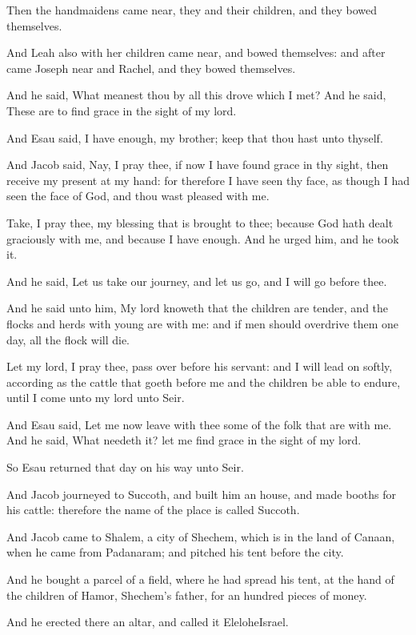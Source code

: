 \Verse Then the handmaidens came near, they and their children, and they bowed themselves.

\Verse And Leah also with her children came near, and bowed themselves: and after came Joseph near and Rachel, and they bowed themselves.

\Verse And he said, What meanest thou by all this drove which I met? And he said, These are to find grace in the sight of my lord.

\Verse And Esau said, I have enough, my brother; keep that thou hast unto thyself.

\Verse And Jacob said, Nay, I pray thee, if now I have found grace in thy sight, then receive my present at my hand: for therefore I have seen thy face, as though I had seen the face of God, and thou wast pleased with me.

\Verse Take, I pray thee, my blessing that is brought to thee; because God hath dealt graciously with me, and because I have enough. And he urged him, and he took it.

\Verse And he said, Let us take our journey, and let us go, and I will go before thee.

\Verse And he said unto him, My lord knoweth that the children are tender, and the flocks and herds with young are with me: and if men should overdrive them one day, all the flock will die.

\Verse Let my lord, I pray thee, pass over before his servant: and I will lead on softly, according as the cattle that goeth before me and the children be able to endure, until I come unto my lord unto Seir.

\Verse And Esau said, Let me now leave with thee some of the folk that are with me. And he said, What needeth it? let me find grace in the sight of my lord.

\Verse So Esau returned that day on his way unto Seir.

\Verse And Jacob journeyed to Succoth, and built him an house, and made booths for his cattle: therefore the name of the place is called Succoth.

\Verse And Jacob came to Shalem, a city of Shechem, which is in the land of Canaan, when he came from Padanaram; and pitched his tent before the city.

\Verse And he bought a parcel of a field, where he had spread his tent, at the hand of the children of Hamor, Shechem's father, for an hundred pieces of money.

\Verse And he erected there an altar, and called it EleloheIsrael.


